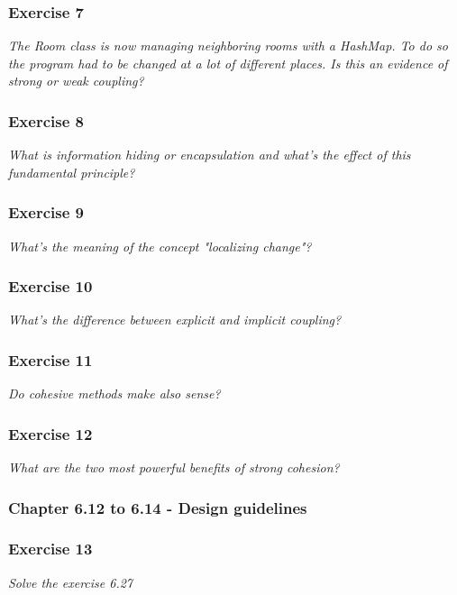 \subsubsection*{Exercise 7}
\textit{The Room class is now managing neighboring rooms with a HashMap.
To do so the program had to be changed at a lot of different places. 
Is this an evidence of strong or weak coupling?} \\

\subsubsection*{Exercise 8}
\textit{What is information hiding or encapsulation and what's the effect
of this fundamental principle?} \\

\subsubsection*{Exercise 9}
\textit{What's the meaning of the concept "localizing change"?} \\

\subsubsection*{Exercise 10}
\textit{What's the difference between explicit and implicit coupling?} \\

\subsubsection*{Exercise 11}
\textit{Do cohesive methods make also sense?} \\

\subsubsection*{Exercise 12}
\textit{What are the two most powerful benefits of strong cohesion?} \\

\subsubsection{Chapter 6.12 to 6.14 - Design guidelines}

\subsubsection*{Exercise 13}
\textit{Solve the exercise 6.27} \\

